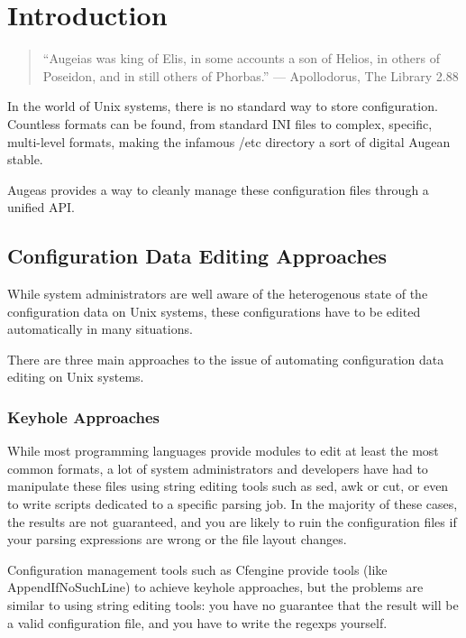 \cleardoublepage
{}
{}
\chapter*{Introduction}

\begin{quote}
``Augeias was king of Elis, in some accounts a son of Helios, in others of Poseidon, and in still others of Phorbas.'' --- Apollodorus, The Library 2.88
\end{quote}

In the world of Unix systems, there is no standard way to store configuration. Countless formats can be found, from standard INI files to complex, specific, multi-level formats, making the infamous /etc directory a sort of digital Augean stable.

Augeas provides a way to cleanly manage these configuration files through a unified API.

\section{Configuration Data Editing Approaches}

While system administrators are well aware of the heterogenous state of the configuration data on Unix systems, these configurations have to be edited automatically in many situations.

There are three main approaches to the issue of automating configuration data editing on Unix systems.

\subsection{Keyhole Approaches}

While most programming languages provide modules to edit at least the most common formats, a lot of system administrators and developers have had to manipulate these files using string editing tools such as sed, awk or cut, or even to write scripts dedicated to a specific parsing job. In the majority of these cases, the results are not guaranteed, and you are likely to ruin the configuration files if your parsing expressions are wrong or the file layout changes.

Configuration management tools such as Cfengine provide tools (like AppendIfNoSuchLine) to achieve keyhole approaches, but the problems are similar to using string editing tools: you have no guarantee that the result will be a valid configuration file, and you have to write the regexps yourself.

